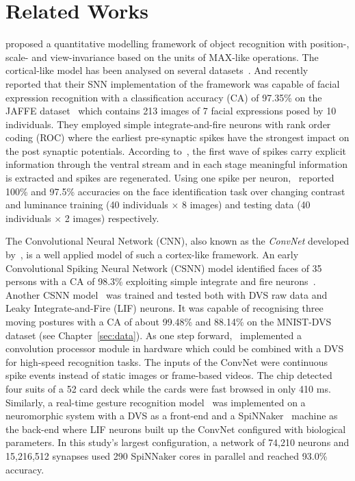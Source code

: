 \documentclass[journal]{journal}
\begin{document}
\section{Related Works}
	\cite{riesenhuber1999hierarchical} proposed a quantitative modelling framework of object recognition with position-, scale- and view-invariance based on the units of MAX-like operations.
	The cortical-like model has been analysed on several datasets~\cite{serre2007robust}.
	And recently~\cite{fu2012spiking} reported that their SNN implementation of the framework was capable of facial expression recognition with a classification accuracy (CA) of 97.35\% on the JAFFE dataset~\cite{lyons1998coding} which contains 213 images of 7 facial expressions posed by 10 individuals.
	They employed simple integrate-and-fire neurons with rank order coding (ROC) where  the earliest pre-synaptic spikes have the strongest impact on the post synaptic potentials.
	According to~\cite{vanrullen2002surfing}, the first wave of spikes  carry explicit information through the ventral stream and in each stage meaningful information is extracted and spikes are regenerated. 
	Using one spike per neuron,~\cite{delorme2001face} reported 100\% and 97.5\% accuracies on the face identification task over changing  contrast and luminance training (40 individuals $\times$ 8 images) and testing data (40 individuals $\times$ 2 images) respectively.
	
	The Convolutional Neural Network (CNN), also known as the \textit{ConvNet} developed by~\cite{lecun1998gradient}, is a well applied model of such a cortex-like framework.
	An early Convolutional Spiking Neural Network (CSNN) model identified faces of 35 persons with a CA of 98.3\% exploiting simple integrate and fire neurons~\cite{matsugu2002convolutional}.
	Another CSNN model~\cite{zhao2014feedforward} was trained and tested both with DVS raw data and Leaky Integrate-and-Fire (LIF) neurons.
	It was capable of recognising three moving postures with a CA of about 99.48\% and 88.14\% on the MNIST-DVS dataset (see Chapter~\ref{sec:data}).
	As one step forward,~\cite{camunas2012event} implemented a convolution processor module in hardware which could be combined with a DVS for high-speed recognition tasks.
	The inputs of the ConvNet were continuous spike events instead of static images or frame-based videos. 
	The chip detected four suits of a 52 card deck while the cards were fast browsed in only 410 ms.
	Similarly, a real-time gesture recognition model~\cite{liu2014real} was implemented on a neuromorphic system with a DVS as a front-end and a SpiNNaker~\cite{furber2014spinnaker} machine as the back-end where LIF neurons built up the ConvNet configured with biological parameters.
	In this study's largest configuration, a network of 74,210 neurons and 15,216,512 synapses used 290 SpiNNaker cores in parallel and reached 93.0\% accuracy. 
	
\end{document}
